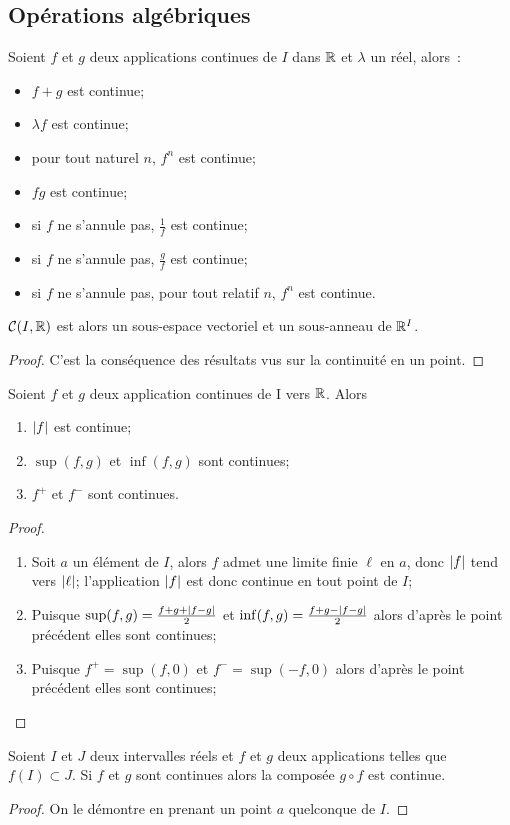 \subsection{Opérations algébriques}

\begin{prop}
  Soient \(f\) et \(g\) deux applications continues de \(I\) dans \(\mathbb{R}\) et \(\lambda\) un réel, alors~:
  \begin{itemize}
  \item \(f+g\) est continue;
  \item \(\lambda f\) est continue;
  \item pour tout naturel \(n\), \(f^n\) est continue;
  \item \(fg\) est continue;
  \item si \(f\) ne s'annule pas, \(\frac{1}{f}\) est continue;
  \item si \(f\) ne s'annule pas, \(\frac{g}{f}\) est continue;
  \item si \(f\) ne s'annule pas, pour tout relatif \(n\), \(f^n\) est continue.
  \end{itemize}
  \(\mathcal{C}(I,\mathbb{R})\) est alors un sous-espace vectoriel et un sous-anneau de \(\mathbb{R}^I\).
\end{prop}
\begin{proof}
  C'est la conséquence des résultats vus sur la continuité en un point.
\end{proof}
\begin{prop}
  Soient \(f\) et \(g\) deux application continues de I vers \(\mathbb{R}\). Alors
  \begin{enumerate}
  \item \(\left\lvert f\right\rvert\) est continue;
  \item \(\sup(f,g)\) et \(\inf(f,g)\) sont continues;
  \item \(f^{+}\) et \(f^{-}\) sont continues.
  \end{enumerate}
\end{prop}
\begin{proof}
  \begin{enumerate}
  \item Soit \(a\) un élément de \(I\), alors \(f\) admet une limite finie \(\ell\) en \(a\), donc \(\left\lvert f\right\rvert\) tend vers \(\left\lvert\ell\right\rvert\); l'application \(\left\lvert f\right\rvert\) est donc continue en tout point de \(I\);
  \item Puisque \(\sup(f,g)=\frac{f+g+\left\lvert f-g\right\rvert}{2}\) et \(\inf(f,g)=\frac{f+g-\left\lvert f-g\right\rvert}{2}\) alors d'après le point précédent elles sont continues;
  \item Puisque \(f^{+}=\sup(f,0)\) et \(f^{-}=\sup(-f,0)\) alors d'après le point précédent elles sont continues;
  \end{enumerate}
\end{proof}
\begin{prop}
  Soient \(I\) et \(J\) deux intervalles réels et \(f\) et \(g\) deux applications telles que \(f(I) \subset J\). Si \(f\) et \(g\) sont continues alors la composée \(g \circ f\) est continue.
\end{prop}
\begin{proof}
  On le démontre en prenant un point \(a\) quelconque de \(I\).
\end{proof}

